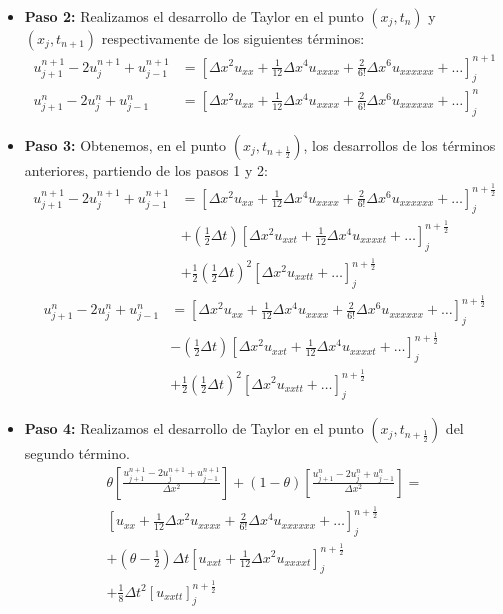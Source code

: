 \documentclass[spanish]{mathnotes}
\begin{document}
\begin{itemize}
			\item \textbf{Paso 2:} Realizamos el desarrollo de Taylor en el punto $\left(x_j, t_n\right)$ y $\left(x_j, t_{n+1}\right)$ respectivamente de los siguientes términos:
			\begin{align*}
			u_{j+1}^{n+1} -2u_{j}^{n+1} + u_{j-1}^{n+1} & = \left[\Delta x ^2 u_{xx} + \frac{1}{12}\Delta x ^4 u_{xxxx} + \frac{2}{6!}\Delta x ^6 u_{xxxxxx}+\hdots \right]_j^{n+1}\\
			u_{j+1}^{n} -2u_{j}^{n} + u_{j-1}^{n} & = \left[\Delta x ^2 u_{xx} + \frac{1}{12}\Delta x ^4 u_{xxxx} + \frac{2}{6!}\Delta x ^6 u_{xxxxxx}+\hdots \right]_j^{n}
			\end{align*}
			\item \textbf{Paso 3:} Obtenemos, en el punto $\left(x_j, t_{n+\frac{1}{2}}\right)$, los desarrollos de los términos anteriores, partiendo de los pasos 1 y 2:
			\begin{align*}
			u_{j+1}^{n+1} -2u_{j}^{n+1} + u_{j-1}^{n+1} & = \left[\Delta x ^2 u_{xx} + \frac{1}{12}\Delta x ^4 u_{xxxx} + \frac{2}{6!}\Delta x^6 u_{xxxxxx}+\hdots \right]_j^{n+\frac{1}{2}}\\
			& + \left(\frac{1}{2}\Delta t\right) \left[\Delta x ^2 u_{xxt} + \frac{1}{12}\Delta x ^4 u_{xxxxt} +\hdots \right]_j^{n+\frac{1}{2}}\\
			& + \frac{1}{2}\left(\frac{1}{2}\Delta t\right)^2 \left[\Delta x ^2 u_{xxtt} + \hdots \right]_j^{n+\frac{1}{2}}
			\end{align*}
			\begin{align*}
			u_{j+1}^{n} -2u_{j}^{n} + u_{j-1}^{n} & = \left[\Delta x ^2 u_{xx} + \frac{1}{12}\Delta x ^4 u_{xxxx} + \frac{2}{6!}\Delta x^6 u_{xxxxxx}+\hdots \right]_j^{n+\frac{1}{2}}\\
			& - \left(\frac{1}{2}\Delta t\right) \left[\Delta x ^2 u_{xxt} + \frac{1}{12}\Delta x ^4 u_{xxxxt} +\hdots \right]_j^{n+\frac{1}{2}}\\
			& + \frac{1}{2}\left(\frac{1}{2}\Delta t\right)^2 \left[\Delta x ^2 u_{xxtt} + \hdots \right]_j^{n+\frac{1}{2}}
			\end{align*}
			
			\item \textbf{Paso 4: } Realizamos el desarrollo de Taylor en el punto $\left(x_j, t_{n+\frac{1}{2}}\right)$ del segundo término.
			\begin{align*}
			\theta\left[\frac{u_{j+1}^{n+1}-2u_{j}^{n+1}+u_{j-1}^{n+1}}{\Delta x ^2}\right] + (1 - \theta) \left[\frac{u_{j+1}^{n}-2u_{j}^{n}+u_{j-1}^{n}}{\Delta x ^2}\right] = \\
			\left[u_{xx} + \frac{1}{12}\Delta x^2 u_{xxxx} + \frac{2}{6!}\Delta x ^4 u_{xxxxxx}  + \hdots\right]_j^{n+\frac{1}{2}}\\
			+\left(\theta - \frac{1}{2}\right)\Delta t \left[u_{xxt} + \frac{1}{12}\Delta x ^2 u_{xxxxt}\right]_j^{n+\frac{1}{2}}\\
			+\frac{1}{8}\Delta t ^2\left[u_{xxtt}\right]_j^{n+\frac{1}{2}}
			\end{align*}
			

\end{itemize}
\end{document}
